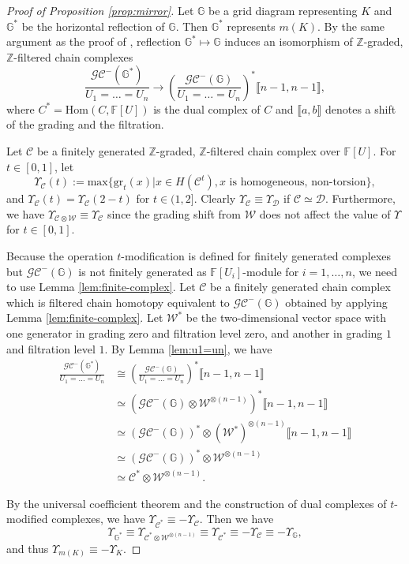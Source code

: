 \documentclass[12pt]{amsart}
\theoremstyle{plain}
\theoremstyle{definition}
\theoremstyle{plain}
\theoremstyle{definition}
\newcommand{\Z}{\mathbb{Z}}
\newcommand{\G}{\mathbb{G}}
\numberwithin{equation}{section}
\begin{document}
\begin{proof}[Proof of Proposition \ref{prop:mirror}]
Let $\G$ be a grid diagram representing $K$ and $\G^*$ be the horizontal reflection of $\G$.
Then $\G^*$ represents $m(K)$.
By the same argument as the proof of \cite[Propositions 7.4.3]{Grid-homology-for-knots-and-links}, reflection $\G^*\mapsto\G$ induces an isomorphism of $\Z$-graded, $\Z$-filtered chain complexes
\[
\frac{\mathcal{GC}^-(\G^*)}{U_1=\dots=U_n}\to \left( \frac{\mathcal{GC}^-(\G)}{U_1=\dots=U_n} \right)^* \llbracket n-1,n-1\rrbracket,
\]
where $C^*=\mathrm{Hom}(C,\mathbb{F}[U])$ is the dual complex of $C$ and $\llbracket a,b\rrbracket$ denotes a shift of the grading and the filtration.

Let $\mathcal{C}$ be a finitely generated $\Z$-graded, $\Z$-filtered chain complex over $\mathbb{F}[U]$.
For $t\in[0,1]$, let 
\[
\Upsilon_\mathcal{C}(t):=\mathrm{max}\{\mathrm{gr}_t(x)|x\in H(\mathcal{C}^t),x\textrm{ is homogeneous, non-torsion}\},
\]
and $\Upsilon_\mathcal{C}(t)=\Upsilon_\mathcal{C}(2-t)$ for $t\in(1,2]$.
Clearly $\Upsilon_{\mathcal{C}}\equiv\Upsilon_\mathcal{D}$ if $\mathcal{C}\simeq\mathcal{D}$.
Furthermore, we have $\Upsilon_{\mathcal{C}\otimes\mathcal{W}}\equiv\Upsilon_\mathcal{C}$ since the grading shift from $\mathcal{W}$ does not affect the value of $\Upsilon$ for $t\in[0,1]$.


Because the operation $t$-modification is defined for finitely generated complexes but $\mathcal{GC}^-(\G)$ is not finitely generated as $\mathbb{F}[U_i]$-module for $i=1,\dots,n$, we need to use Lemma \ref{lem:finite-complex}.
Let $\mathcal{C}$ be a finitely generated chain complex which is filtered chain homotopy equivalent to $\mathcal{GC}^-(\G)$ obtained by applying Lemma \ref{lem:finite-complex}.
Let $\mathcal{W}^*$ be the two-dimensional vector space with one generator in grading zero and filtration level zero, and another in grading $1$ and filtration level $1$.
By Lemma \ref{lem:u1=un}, we have
\begin{align*}
\frac{\mathcal{GC}^-(\G^*)}{U_1=\dots=U_n} &\cong \left( \frac{\mathcal{GC}^-(\G)}{U_1=\dots=U_n} \right)^* \llbracket n-1,n-1\rrbracket\\
 &\simeq (\mathcal{GC}^-(\G)\otimes \mathcal{W}^{\otimes (n-1)})^*\llbracket n-1,n-1\rrbracket\\
 &\simeq (\mathcal{GC}^-(\G))^* \otimes (\mathcal{W}^*)^{\otimes (n-1)}\llbracket n-1,n-1\rrbracket\\
 &\simeq (\mathcal{GC}^-(\G))^* \otimes \mathcal{W}^{\otimes (n-1)}\\
 &\simeq \mathcal{C}^* \otimes \mathcal{W}^{\otimes (n-1)}.
\end{align*}

By the universal coefficient theorem and the construction of dual complexes of $t$-modified complexes, we have $\Upsilon_{\mathcal{C}^*}\equiv-\Upsilon_\mathcal{C}$.
Then we have 
\[\Upsilon_{\G^*}\equiv\Upsilon_{\mathcal{C}^*\otimes \mathcal{W}^{\otimes (n-1)}}\equiv\Upsilon_{\mathcal{C}^*}\equiv-\Upsilon_\mathcal{C}\equiv-\Upsilon_\G,
\]
and thus $\Upsilon_{m(K)}\equiv-\Upsilon_K$.
\end{proof}
\end{document}
